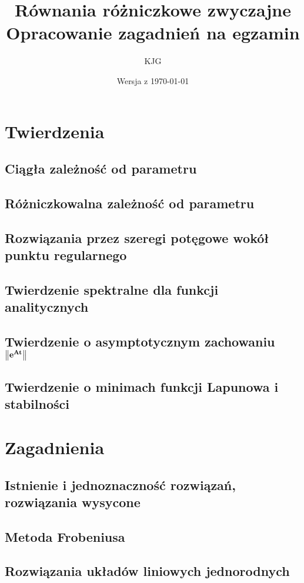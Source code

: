 \documentclass{mwart}
\title{
  \Huge \textbf{Równania różniczkowe zwyczajne} \\
  \Large Opracowanie zagadnień na egzamin
}
\author{ KJG }
\date{ Wersja z \today }
\DeclarePairedDelimiter\norm{\lVert}{\rVert}
\begin{document}
	
  \maketitle
  \newpage
  
  \tableofcontents
  \newpage
  
  \section{Twierdzenia}
    \subsection{Ciągła zależność od parametru}
    \subsection{Różniczkowalna zależność od parametru}
    \subsection{Rozwiązania przez szeregi potęgowe wokół punktu regularnego}
    \subsection{Twierdzenie spektralne dla funkcji analitycznych}
    \subsection{Twierdzenie o asymptotycznym zachowaniu $\mathbf{ \norm*{e^{At}} }$}
    \subsection{Twierdzenie o minimach funkcji Lapunowa i stabilności}
  
  \section{Zagadnienia}
    \subsection{Istnienie i jednoznaczność rozwiązań, rozwiązania wysycone}
      
    \subsection{Metoda Frobeniusa}
    \subsection{Rozwiązania układów liniowych jednorodnych}
\end{document}
